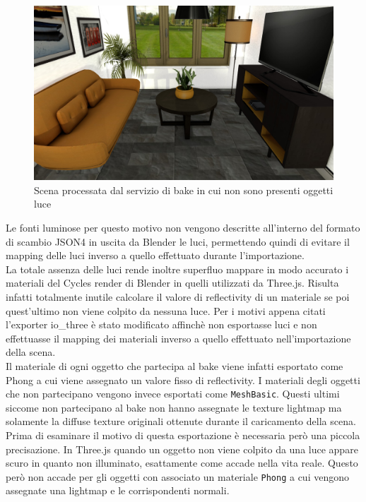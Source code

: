 \begin{figure}[htb]
 \centering
 \includegraphics[width=1\linewidth]{images/chapter_baking_service/bake_no_luci.png}\hfill
 \caption[Scena processata dal servizio di bake ]{Scena processata dal servizio di bake in cui non sono presenti oggetti luce}
 \label{fig:baking_service_bake_no_luci}
\end{figure}
Le fonti luminose per questo motivo non vengono descritte all’interno del formato di scambio JSON4 in uscita da Blender  le luci, permettendo quindi di evitare il mapping delle luci inverso a quello effettuato durante l’importazione.
\\
La totale assenza delle luci rende inoltre superfluo mappare in modo accurato i materiali del Cycles render di Blender in quelli utilizzati da Three.js. 
Risulta infatti totalmente inutile calcolare il valore di reflectivity di un materiale se poi quest’ultimo non viene colpito da nessuna luce.
Per i motivi appena citati l’exporter io\_three è stato modificato affinchè non esportasse luci e non effettuasse il mapping dei materiali inverso a quello effettuato nell’importazione della scena.
\\
Il materiale di ogni oggetto che partecipa al bake viene infatti esportato come Phong a cui viene assegnato un valore fisso di reflectivity.
I materiali degli oggetti che non partecipano vengono invece esportati come \texttt{MeshBasic}.
Questi ultimi siccome non partecipano al bake non hanno assegnate le texture lightmap ma solamente la diffuse texture originali ottenute durante il caricamento della scena.
Prima di esaminare il motivo di questa esportazione è necessaria però una piccola precisazione. 
In Three.js quando un oggetto non viene colpito da una luce appare scuro in quanto non illuminato, esattamente come accade nella vita reale.
Questo però non accade per gli oggetti con associato un materiale \texttt{Phong} a cui vengono assegnate una lightmap e le corrispondenti normali.

